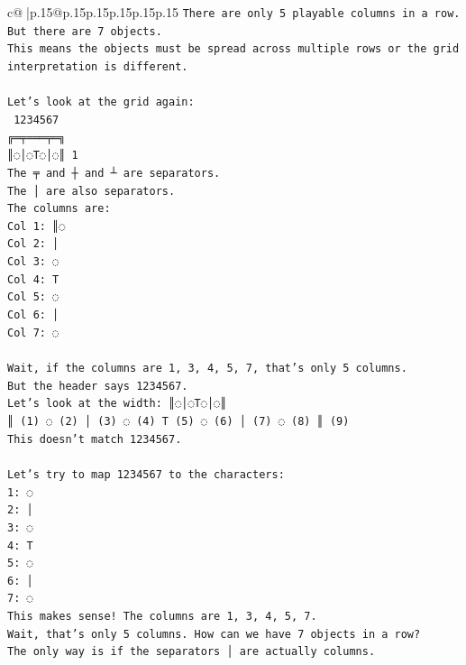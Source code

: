 \documentclass{article}
\begin{document}
{\begin{supertabular}{c@{$\;$}|p{.15\linewidth}@{}p{.15\linewidth}p{.15\linewidth}p{.15\linewidth}p{.15\linewidth}p{.15\linewidth}}
{{{\texttt{There are only 5 playable columns in a row. But there are 7 objects.} \\
\texttt{This means the objects must be spread across multiple rows or the grid interpretation is different.} \\
\\ 
\texttt{Let's look at the grid again:} \\
\texttt{ 1234567} \\
\texttt{╔═╤═══╤═╗} \\
\texttt{║◌│◌T◌│◌║ 1} \\
\texttt{The ╤ and ┼ and ┴ are separators.} \\
\texttt{The │ are also separators.} \\
\texttt{The columns are:} \\
\texttt{Col 1: ║◌} \\
\texttt{Col 2: │} \\
\texttt{Col 3: ◌} \\
\texttt{Col 4: T} \\
\texttt{Col 5: ◌} \\
\texttt{Col 6: │} \\
\texttt{Col 7: ◌} \\
\\ 
\texttt{Wait, if the columns are 1, 3, 4, 5, 7, that's only 5 columns.} \\
\texttt{But the header says 1234567.} \\
\texttt{Let's look at the width: ║◌│◌T◌│◌║} \\
\texttt{║ (1) ◌ (2) │ (3) ◌ (4) T (5) ◌ (6) │ (7) ◌ (8) ║ (9)} \\
\texttt{This doesn't match 1234567.} \\
\\ 
\texttt{Let's try to map 1234567 to the characters:} \\
\texttt{1: ◌} \\
\texttt{2: │} \\
\texttt{3: ◌} \\
\texttt{4: T} \\
\texttt{5: ◌} \\
\texttt{6: │} \\
\texttt{7: ◌} \\
\texttt{This makes sense! The columns are 1, 3, 4, 5, 7.} \\
\texttt{Wait, that's only 5 columns. How can we have 7 objects in a row?} \\
\texttt{The only way is if the separators │ are actually columns.} \\
}}}
\end{supertabular}}
\end{document}
